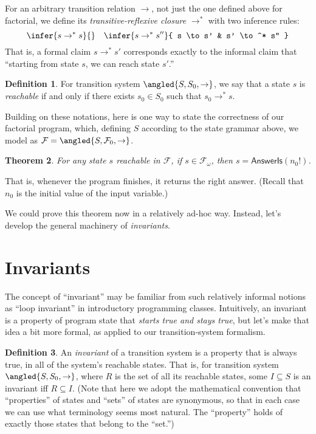 \documentclass{amsbook}
\newtheorem{theorem}{Theorem}[chapter]
\theoremstyle{definition}
\newtheorem{definition}[theorem]{Definition}
\theoremstyle{remark}
\numberwithin{section}{chapter}
\numberwithin{equation}{chapter}
\begin{document}
For an arbitrary transition relation $\to$, not just the one defined above for factorial, we define its \emph{transitive-reflexive closure} $\to^*$ with two inference rules:
$$\infer{s \to^* s}{}
\quad \infer{s \to^* s''}{
  s \to s'
  & s' \to^* s''
}$$
That is, a formal claim $s \to^* s'$ corresponds exactly to the informal claim that ``starting from state $s$, we can reach state $s'$.''

\begin{definition}
  For transition system $\angled{S, S_0, \to}$, we say that a state $s$ is \emph{reachable} if and only if there exists $s_0 \in S_0$ such that $s_0 \to^* s$.
\end{definition}

Building on these notations, here is one way to state the correctness of our factorial program, which, defining $S$ according to the state grammar above, we model as $\mathcal F = \angled{S, \mathcal F_0, \to}$.

\begin{theorem}\label{factorial_ok}
  For any state $s$ reachable in $\mathcal F$, if $s \in \mathcal F_\omega$, then $s = \mathsf{AnswerIs}(n_0!)$.
\end{theorem}

That is, whenever the program finishes, it returns the right answer.
(Recall that $n_0$ is the initial value of the input variable.)

We could prove this theorem now in a relatively ad-hoc way.
Instead, let's develop the general machinery of \emph{invariants}.


\section{Invariants}

The concept of ``invariant'' may be familiar from such relatively informal notions as ``loop invariant'' in introductory programming classes.
Intuitively, an invariant is a property of program state that \emph{starts true and stays true}, but let's make that idea a bit more formal, as applied to our transition-system formalism.

\newcommand{\invariants}[0]{}

\invariants
\begin{definition}
  An \emph{invariant} of a transition system is a property that is always true, in all of the system's reachable states.  That is, for transition system $\angled{S, S_0, \to}$, where $R$ is the set of all its reachable states, some $I \subseteq S$ is an invariant iff $R \subseteq I$.  (Note that here we adopt the mathematical convention that ``properties'' of states and ``sets'' of states are synonymous, so that in each case we can use what terminology seems most natural.  The ``property'' holds of exactly those states that belong to the ``set.'')
\end{definition}
\end{document}
